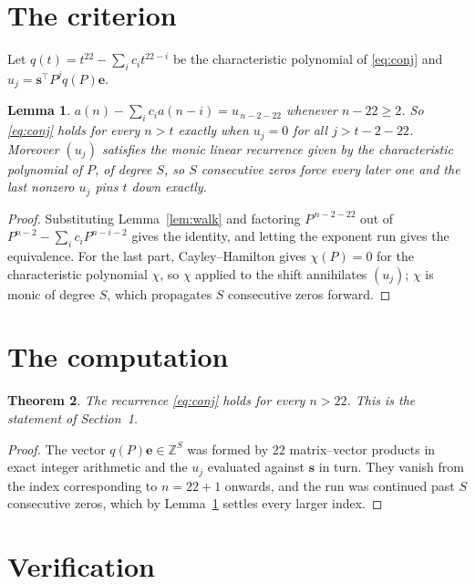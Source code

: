 \documentclass[11pt,a4paper]{article}
\theoremstyle{plain}
\newtheorem{theorem}{Theorem}
\newtheorem{lemma}[theorem]{Lemma}
\theoremstyle{definition}
\begin{document}
\section{The criterion}

Let $q(t)=t^{22}-\sum_i c_i t^{22-i}$ be the characteristic polynomial of
\eqref{eq:conj} and $u_j=\mathbf{s}^{\!\top}P^{j}q(P)\mathbf{e}$.

\begin{lemma}\label{lem:crit}
$a(n)-\sum_i c_i a(n-i)=u_{\,n-2-22}$ whenever $n-22\ge2$. So \eqref{eq:conj}
holds for every $n>t$ exactly when $u_j=0$ for all $j>t-2-22$. Moreover $(u_j)$
satisfies the monic linear recurrence given by the characteristic polynomial of $P$, of
degree $S$, so $S$ consecutive zeros force every later one and the last nonzero $u_j$ pins
$t$ down exactly.
\end{lemma}

\begin{proof}
Substituting Lemma~\ref{lem:walk} and factoring $P^{\,n-2-22}$ out of
$P^{n-2}-\sum_i c_i P^{n-i-2}$ gives the identity, and letting the exponent run gives the
equivalence. For the last part, Cayley--Hamilton gives $\chi(P)=0$ for the characteristic
polynomial $\chi$, so $\chi$ applied to the shift annihilates $(u_j)$; $\chi$ is monic of
degree $S$, which propagates $S$ consecutive zeros forward.
\end{proof}

\section{The computation}

\begin{theorem}
The recurrence \eqref{eq:conj} holds for every $n>22$. This is the statement of
Section~1.
\end{theorem}

\begin{proof}
The vector $q(P)\mathbf{e}\in\mathbb{Z}^{S}$ was formed by $22$ matrix--vector
products in exact integer arithmetic and the $u_j$ evaluated against $\mathbf{s}$ in turn.
They vanish from the index corresponding to $n=22+1$ onwards, and the run was continued
past $S$ consecutive zeros, which by Lemma~\ref{lem:crit} settles every larger index.
\end{proof}

\section{Verification}
\end{document}
